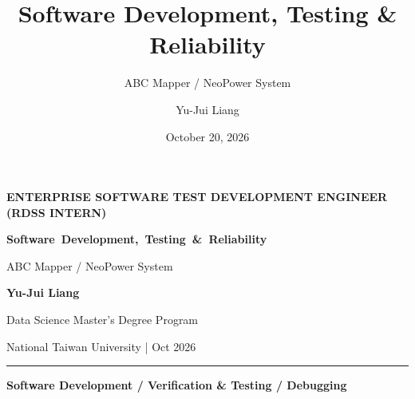 \documentclass[aspectratio=169,10pt]{beamer}
\title[Software Development and Testing]{Software Development, Testing \& Reliability}
\subtitle{ABC Mapper / NeoPower System}
\author{Yu-Jui Liang}
\institute{National Taiwan University \quad | \quad Data Science Master's Degree Program}
\date{October 20, 2026}
\newcommand{\smalllabel}[1]{{\scriptsize\bfseries\color{Accent}\MakeUppercase{#1}}}
\begin{document}
{
\begin{frame}[plain]
  \vspace*{1.00cm}
  \smalllabel{Enterprise Software Test Development Engineer (RDSS Intern)}\par
  \vspace{0.62cm}
  {\raggedright\fontsize{17}{21}\selectfont\bfseries\color{Ink}
    \mbox{Software Development, Testing \& Reliability}\par}
  \vspace{0.43cm}
  {\color{Muted}\normalsize ABC Mapper \quad / \quad NeoPower System\par}
  \vspace{0.94cm}
  {\bfseries Yu-Jui Liang}\par
  \vspace{0.08cm}
  {\normalsize\color{Muted}Data Science Master's Degree Program\par}
  \vspace{0.05cm}
  {\small\color{Muted}National Taiwan University \quad |  Oct 2026\par}
  \vfill
  {\color{Accent}\rule{\textwidth}{0.7pt}}\par\vspace{0.03cm}
  {\small\bfseries\color{Muted}Software Development \quad / \quad Verification \& Testing \quad / \quad Debugging}
\end{frame}}
\end{document}
